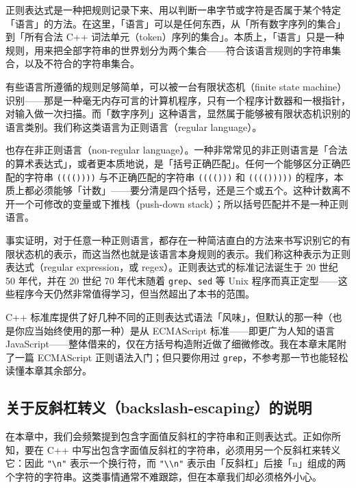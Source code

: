 正则表达式是一种把规则记录下来、用以判断一串字节或字符是否属于某个特定「语言」的方法。在这里，「语言」可以是任何东西，从「所有数字序列的集合」到「所有合法 C++ 词法单元（token）序列的集合」。本质上，「语言」只是一种规则，用来把全部字符串的世界划分为两个集合——符合该语言规则的字符串集合，以及不符合的字符串集合。

有些语言所遵循的规则足够简单，可以被一台有限状态机（finite state machine）识别——那是一种毫无内存可言的计算机程序，只有一个程序计数器和一根指针，对输入做一次扫描。而「数字序列」这种语言，显然属于能够被有限状态机识别的语言类别。我们称这类语言为正则语言（regular language）。

也存在非正则语言（non-regular language）。一种非常常见的非正则语言是「合法的算术表达式」，或者更本质地说，是「括号正确匹配」。任何一个能够区分正确匹配的字符串 \texttt{(\allowbreak{}(\allowbreak{}(\allowbreak{}(\allowbreak{})\allowbreak{})\allowbreak{})\allowbreak{})\allowbreak{}} 与不正确匹配的字符串 \texttt{(\allowbreak{}(\allowbreak{}(\allowbreak{}(\allowbreak{})\allowbreak{})\allowbreak{})\allowbreak{}} 和 \texttt{(\allowbreak{}(\allowbreak{}(\allowbreak{}(\allowbreak{})\allowbreak{})\allowbreak{})\allowbreak{})\allowbreak{})\allowbreak{}} 的程序，本质上都必须能够「计数」——要分清是四个括号，还是三个或五个。这种计数离不开一个可修改的变量或下推栈（push-down stack）；所以括号匹配并不是一种正则语言。

事实证明，对于任意一种正则语言，都存在一种简洁直白的方法来书写识别它的有限状态机的表示，而这当然也就是该语言本身规则的表示。我们称这种表示为正则表达式（regular expression，或 regex）。正则表达式的标准记法诞生于 20 世纪 50 年代，并在 20 世纪 70 年代末随着 \texttt{grep}、\texttt{sed} 等 Unix 程序而真正定型——这些程序今天仍然非常值得学习，但当然超出了本书的范围。

C++ 标准库提供了好几种不同的正则表达式语法「风味」，但默认的那一种（也是你应当始终使用的那一种）是从 ECMAScript 标准——即更广为人知的语言 JavaScript——整体借来的，仅在方括号构造附近做了细微修改。我在本章末尾附了一篇 ECMAScript 正则语法入门；但只要你用过 \texttt{grep}，不参考那一节也能轻松读懂本章其余部分。

\subsection{关于反斜杠转义（backslash-escaping）的说明}

在本章中，我们会频繁提到包含字面值反斜杠的字符串和正则表达式。正如你所知，要在 C++ 中写出包含字面值反斜杠的字符串，必须用另一个反斜杠来转义它：因此 \texttt{"\textbackslash n"} 表示一个换行符，而 \texttt{"\textbackslash\textbackslash n"} 表示由「反斜杠」后接「n」组成的两个字符的字符串。这类事情通常不难跟踪，但在本章我们却必须格外小心。

